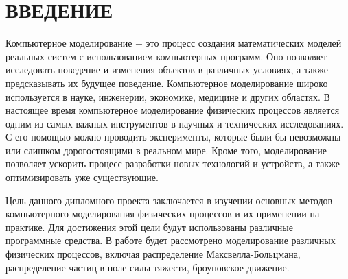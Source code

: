 \chapter*{ВВЕДЕНИЕ}
\label{ch:intro}

Компьютерное моделирование $-$ это процесс создания математических моделей реальных систем с использованием компьютерных программ. Оно позволяет исследовать поведение и изменения объектов в различных условиях, а также предсказывать их будущее поведение. Компьютерное моделирование широко используется в науке, инженерии, экономике, медицине и других областях. В настоящее время компьютерное моделирование физических процессов является одним из самых важных инструментов в научных и технических исследованиях. С его помощью можно проводить эксперименты, которые были бы невозможны или слишком дорогостоящими в реальном мире. Кроме того, моделирование позволяет ускорить процесс разработки новых технологий и устройств, а также оптимизировать уже существующие.

Цель данного дипломного проекта заключается в изучении основных методов компьютерного моделирования физических процессов и их применении на практике. Для достижения этой цели будут использованы различные программные средства. В работе будет рассмотрено моделирование различных физических процессов, включая распределение Максвелла-Больцмана, распределение частиц в поле силы тяжести, броуновское движение.
